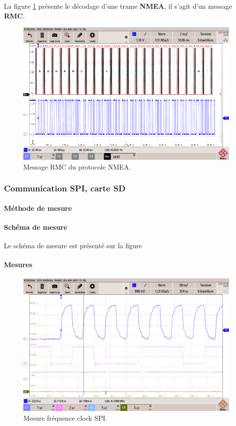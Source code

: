 La figure \ref{fig:message-nmea-rmc} présente le décodage d'une trame \textbf{NMEA}, il s'agit d'un message \textbf{RMC}.

\begin{figure}[H]
	\centering
	\includegraphics[width=0.7\linewidth]{../figures/mesures/UART/message-NMEA-RMC}
	\caption{Message RMC du protocole NMEA.}
	\label{fig:message-nmea-rmc}
\end{figure}


\subsubsection{Communication SPI, carte SD} \label{ssec:Comm-SPI}
\paragraph{Méthode de mesure}
\paragraph{Schéma de mesure} Le schéma de mesure est présenté sur la figure
\paragraph{Mesures}

\begin{figure}[H]
	\centering
	\includegraphics[width=0.7\linewidth]{../figures/mesures/SPI/freq-spi}
	\caption{Mesure fréquence clock SPI.}
	\label{fig:freq-spi}
\end{figure}

